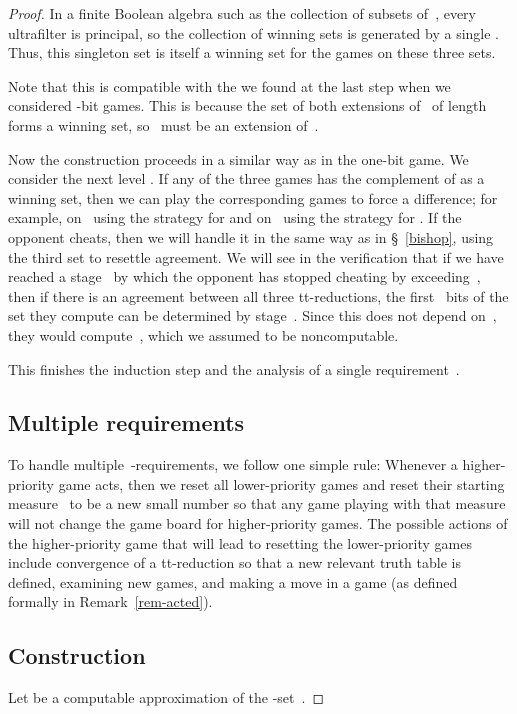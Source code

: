 \documentclass{LMCS}
\newcommand{\0}{\mathbf{0}}
\newcommand{\<}{\langle}
\renewcommand{\>}{\rangle}
\begin{document}
\begin{proof}
In a finite Boolean algebra such as the collection of subsets of~, every
ultrafilter is principal, so the collection of winning sets is generated by a
single . Thus, this singleton set  is itself a
winning set for the games  on these three sets.

Note that this  is compatible with the  we
found at the last step when we considered -bit games.  This is because
the set of both extensions of~ of length~ forms a winning set,
so~ must be an extension of~.


Now the construction proceeds in a similar way as in the one-bit game. We
consider the next level . If any of the three
games has the complement of  as a winning set, then we can play
the corresponding games to force a difference; for example,
 on~ using the strategy for  and
 on~ using the strategy for
. If the opponent cheats, then we will handle it in
the same way as in \S~\ref{bishop}, using the third set to resettle
agreement. We will see in the verification that if we have reached a
stage~ by which the opponent has stopped cheating by
exceeding~, then if there is an agreement between all three
tt-reductions, the first~ bits of the set they compute can be determined
by stage~. Since this does not depend on~, they would compute~,
which we assumed to be noncomputable.

This finishes the induction step and the analysis of a single
requirement~.

\subsection{Multiple requirements}

To handle multiple~-requirements, we follow one simple rule:
Whenever a higher-priority game acts, then we reset all lower-priority games
and reset their starting measure~ to be a new small number so
that any game playing with that measure will not change the game board for
higher-priority games.  The possible actions of the higher-priority game that
will lead to resetting the lower-priority games include convergence of a
tt-reduction so that a new relevant truth table is defined,
examining new games, and making a move in a game (as defined formally in
Remark~\ref{rem-acted}).

\subsection{Construction}\label{const}
Let  be a computable approximation of the
-set~.


\end{proof}
\end{document}

